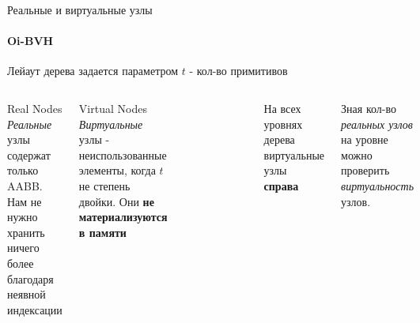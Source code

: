 \begin{frame}[t]{Реальные и виртуальные узлы}
    \framesubtitle{Oi-BVH}
    Лейаут дерева задается параметром $t$ - кол-во примитивов
    \begin{columns}
        \begin{block}{Real Nodes}
            \textit{Реальные} узлы содержат только AABB. Нам не нужно хранить ничего более благодаря неявной индексации
        \end{block}
        \begin{block}{Virtual Nodes}
            \textit{Виртуальные} узлы - неиспользованные элементы, когда $t$ не степень двойки.
            Они \textbf{не материализуются в памяти}
        \end{block}
        \begin{figure}
            \begin{center}
                \includegraphics[width=\textwidth]{res/boi_layout.png}
            \end{center}
        \end{figure}
        На всех уровнях дерева виртуальные узлы \textbf{справа}

        Зная кол-во \textit{реальных узлов} на
        уровне можно проверить \textit{виртуальность} узлов.
    \end{columns}

\end{frame}


